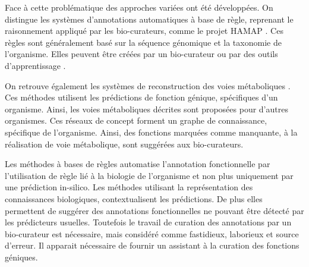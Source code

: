 \begin{refsection}
Face à cette problématique des approches variées ont été développées. On distingue les systèmes d'annotations automatiques à base de règle, reprenant le raisonnement appliqué par les bio-curateurs, comme le projet HAMAP \cite{lima2009hamap}. Ces règles sont généralement basé sur la séquence génomique et la taxonomie de l'organisme. Elles peuvent être créées par un bio-curateur ou par des outils d'apprentissage \cite{uniprot2011ongoing}.

On retrouve également les systèmes de reconstruction des voies métaboliques \cite{karpe2011pathway}. Ces méthodes utilisent les prédictions de fonction génique, spécifiques d'un organisme. Ainsi, les voies métaboliques décrites sont proposées pour d'autres organismes. Ces réseaux de concept forment un graphe de connaissance, spécifique de l'organisme. Ainsi, des fonctions marquées comme manquante, à la réalisation de voie métabolique, sont suggérées aux bio-curateurs.

Les méthodes à bases de règles automatise l'annotation fonctionnelle par l'utilisation de règle lié à la biologie de l'organisme et non plus uniquement par une prédiction in-silico. Les méthodes utilisant la représentation des connaissances biologiques, contextualisent les prédictions. De plus elles permettent de suggérer des annotations fonctionnelles ne pouvant être détecté par les prédicteurs usuelles. Toutefois le travail de curation des annotations par un bio-curateur est nécessaire, mais considéré comme fastidieux, laborieux et source d'erreur. Il apparait nécessaire de fournir un assistant à la curation des fonctions géniques.




\end{refsection}
